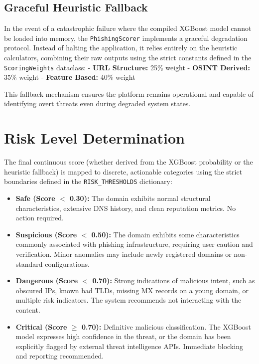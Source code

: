\subsection{Graceful Heuristic
Fallback}\label{graceful-heuristic-fallback}

In the event of a catastrophic failure where the compiled XGBoost model
cannot be loaded into memory, the \texttt{PhishingScorer} implements a
graceful degradation protocol. Instead of halting the application, it
relies entirely on the heuristic calculators, combining their raw
outputs using the strict constants defined in the
\texttt{ScoringWeights} dataclass: - \textbf{URL Structure:} 25\% weight
- \textbf{OSINT Derived:} 35\% weight - \textbf{Feature Based:} 40\%
weight

This fallback mechanism ensures the platform remains operational and
capable of identifying overt threats even during degraded system states.

\section{Risk Level Determination}\label{risk-level-determination}

The final continuous score (whether derived from the XGBoost probability
or the heuristic fallback) is mapped to discrete, actionable categories
using the strict boundaries defined in the \texttt{RISK\_THRESHOLDS}
dictionary:

\begin{itemize}
\item
  \textbf{Safe (Score $<${} 0.30):} The domain exhibits normal
  structural characteristics, extensive DNS history, and clean
  reputation metrics. No action required.
\item
  \textbf{Suspicious (Score $<${} 0.50):} The domain exhibits some
  characteristics commonly associated with phishing infrastructure,
  requiring user caution and verification. Minor anomalies may include
  newly registered domains or non-standard configurations.
\item
  \textbf{Dangerous (Score $<${} 0.70):} Strong indications of
  malicious intent, such as obscured IPs, known bad TLDs, missing MX
  records on a young domain, or multiple risk indicators. The system
  recommends not interacting with the content.
\item
  \textbf{Critical (Score $\ge$ 0.70):} Definitive malicious
  classification. The XGBoost model expresses high confidence in the
  threat, or the domain has been explicitly flagged by external threat
  intelligence APIs. Immediate blocking and reporting recommended.
\end{itemize}

